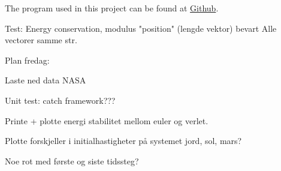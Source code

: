 


The program used in this project can be found at \href{https://github.com/kjetka/Project3}{Github}. 




Test: 		Energy conservation, modulus "position" (lengde vektor) bevart
				Alle vectorer samme str.


Plan fredag:

	Laste ned data NASA


	Unit test: catch framework???

	Printe + plotte energi stabilitet mellom euler og verlet.

	Plotte forskjeller i initialhastigheter på systemet jord, sol, mars?
	
	Noe rot med første og siste tidssteg?
